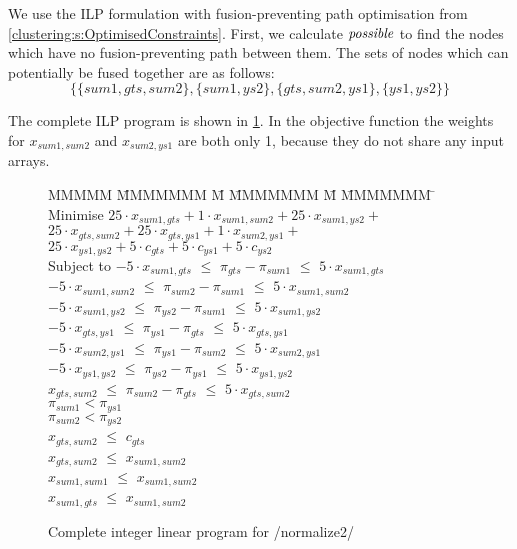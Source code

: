 We use the ILP formulation with fusion-preventing path optimisation from \cref{clustering:s:OptimisedConstraints}.
First, we calculate $\mathit{possible}$ to find the nodes which have no fusion-preventing path between them.
The sets of nodes which can potentially be fused together are as follows:
\[ \{ \{sum1, gts, sum2\}
 , \{sum1, ys2\}
 , \{gts, sum2, ys1\}
 , \{ys1, ys2\} \} \]

The complete ILP program is shown in \cref{fig:clustering:normalize2-ilp}.
In the objective function the weights for $x_{sum1, sum2}$ and $x_{sum2, ys1}$ are both only 1, because they do not share any input arrays.

\begin{figure}
\begin{tabbing}
MMMMM   \= MMMMMMM \= M \= MMMMMMM \= M \= MMMMMMM \= \kill
Minimise   \> $25 \cdot x_{sum1, gts} + 1  \cdot x_{sum1,sum2} + 25 \cdot x_{sum1, ys2} +$ \\
           \> $25 \cdot x_{gts, sum2} + 25 \cdot x_{gts, ys1} + 1 \cdot x_{sum2, ys1} +$ \\
           \> $25 \cdot x_{ys1, ys2}  + 5  \cdot c_{gts} + 5 \cdot c_{ys1} + 5 \cdot c_{ys2} $
\\[0.5ex]
Subject to 
    \> $-5 \cdot x_{sum1, gts}$  \> $\le$ \> $\pi_{gts} - \pi_{sum1}$  \> $\le$ \> $5 \cdot x_{sum1, gts}$  \\
    \> $-5 \cdot x_{sum1, sum2}$ \> $\le$ \> $\pi_{sum2} - \pi_{sum1}$ \> $\le$ \> $5 \cdot x_{sum1, sum2}$ \\
    \> $-5 \cdot x_{sum1, ys2 }$ \> $\le$ \> $\pi_{ys2 } - \pi_{sum1}$ \> $\le$ \> $5 \cdot x_{sum1, ys2 }$ \\
    \> $-5 \cdot x_{gts,  ys1 }$ \> $\le$ \> $\pi_{ys1 } - \pi_{gts }$ \> $\le$ \> $5 \cdot x_{gts, ys1  }$ \\
    \> $-5 \cdot x_{sum2, ys1 }$ \> $\le$ \> $\pi_{ys1 } - \pi_{sum2}$ \> $\le$ \> $5 \cdot x_{sum2, ys1 }$ \\
    \> $-5 \cdot x_{ys1, ys2  }$ \> $\le$ \> $\pi_{ys2 } - \pi_{ys1 }$ \> $\le$ \> $5 \cdot x_{ys1, ys2  }$ 
\\[0.5ex]
    \> $   x_{gts, sum2 }$ \> $\le$ \> $\pi_{sum2} - \pi_{gts }$ \> $\le$ \> $5 \cdot x_{gts, sum2 }$ 
\\[0.5ex]
    \>                     \>       \> $\pi_{sum1} < \pi_{ys1}$ \\
    \>                     \>       \> $\pi_{sum2} < \pi_{ys2}$
\\[0.5ex]
    \> $ x_{gts,sum2} $    \> $\le$ \> $c_{gts}$
\\[0.5ex]
    \> $x_{gts, sum2}$     \> $\le$ \> $x_{sum1, sum2}$ \\
    \> $x_{sum1,sum1}$     \> $\le$ \> $x_{sum1, sum2}$ \\
    \> $x_{sum1, gts}$     \> $\le$ \> $x_{sum1, sum2}$
\end{tabbing}
\caption{Complete integer linear program for \Hs/normalize2/}
\label{fig:clustering:normalize2-ilp}
\end{figure}

